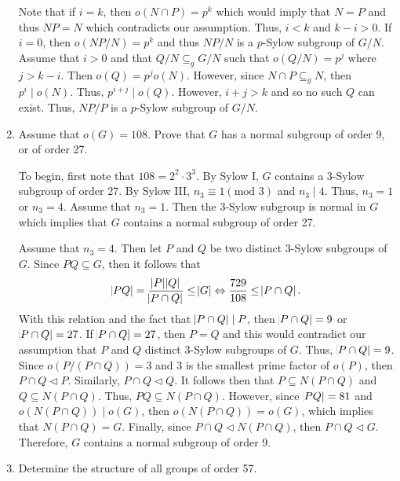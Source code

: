 \documentclass{article}
\makeatletter
\theoremstyle{definition}
\theoremstyle{remark}
\let\oldproofname=\proofname
\renewcommand{\proofname}{\bf{\textit{\oldproofname}}}
\theoremstyle{definition}
\renewenvironment{proof*}[1][\proofname]{\par
  \pushQED{\qed}%
  \normalfont \topsep6\p@\@plus6\p@\relax
  \list{}{\leftmargin=0mm
          \rightmargin=0mm
          \settowidth{\itemindent}{\itshape#1}%
          \labelwidth=\itemindent
          \parsep=0pt \listparindent=0mm%
  }
  \item[\hskip\labelsep
        \itshape
    #1\@addpunct{.}]\ignorespaces
}{%
  \popQED\endlist\@endpefalse
}
\makeatother
\begin{document}
\begin{enumerate}[leftmargin=*]
\begin{proof*}
\begin{equation*}
                    \end{equation*}
                Note that if $i=k$, then $o(N\cap P)=p^k$ which would imply that $N=P$ and thus $NP=N$ which contradicts our assumption. Thus, $i<k$ and $k-i>0$. If $i=0$, then $o(NP/N)=p^k$ and thus $NP/N$ is a $p$-Sylow subgroup of $G/N$. Assume that $i>0$ and that $Q/N\subseteq_g G/N$ such that $o(Q/N)=p^j$ where $j>k-i$. Then $o(Q)=p^jo(N)$. However, since $N\cap P\subseteq_g N$, then $p^i\mid o(N)$. Thus, $p^{i+j}\mid o(Q)$. However, $i+j>k$ and so no such $Q$ can exist. Thus, $NP/P$ is a $p$-Sylow subgroup of $G/N$.
            \end{proof*}
    \newpage
        \item Assume that $o(G)=108$. Prove that $G$ has a normal subgroup of order 9, or of order 27.
            \begin{proof*}
                To begin, first note that $108=2^2\cdot3^3$. By Sylow I, $G$ contains a 3-Sylow subgroup of order 27. By Sylow III, $n_3\equiv 1(\text{mod }3)$ and $n_3\mid 4$. Thus, $n_3=1$ or $n_3=4$. Assume that $n_3=1$. Then the 3-Sylow subgroup is normal in $G$ which implies that $G$ contains a normal subgroup of order 27.\par\hspace{4mm} Assume that $n_3=4$. Then let $P$ and $Q$ be two distinct 3-Sylow subgroups of $G$. Since $PQ\subseteq G$, then it follows that 
                    \begin{equation*}
                        \abs{PQ}=\frac{\abs{P}\abs{Q}}{\abs{P\cap Q}}\leq \abs{G}\Leftrightarrow \frac{729}{108}\leq \abs{P\cap Q}.
                    \end{equation*}
                With this relation and the fact that $\abs{P\cap Q}\mid P$, then $\abs{P\cap Q}=9$ or $\abs{P\cap Q}=27$. If $\abs{P\cap Q}=27$, then $P=Q$ and this would contradict our assumption that $P$ and $Q$ distinct 3-Sylow subgroups of $G$. Thus, $\abs{P\cap Q}=9$. Since $o(P/(P\cap Q))=3$ and 3 is the smallest prime factor of $o(P)$, then $P\cap Q\triangleleft P$. Similarly, $P\cap Q\triangleleft Q$. It follows then that $P\subseteq N(P\cap Q)$ and $Q\subseteq N(P\cap Q)$. Thus, $PQ\subseteq N(P\cap Q)$. However, since $\abs{PQ}=81$ and $o(N(P\cap Q))\mid o(G)$, then $o(N(P\cap Q))=o(G)$, which implies that $N(P\cap Q)=G$. Finally, since $P\cap Q\triangleleft N(P\cap Q)$, then $P\cap Q\triangleleft G$. Therefore, $G$ contains a normal subgroup of order 9.
            \end{proof*}
        \item Determine the structure of all groups of order 57.

\end{enumerate}
\end{document}

